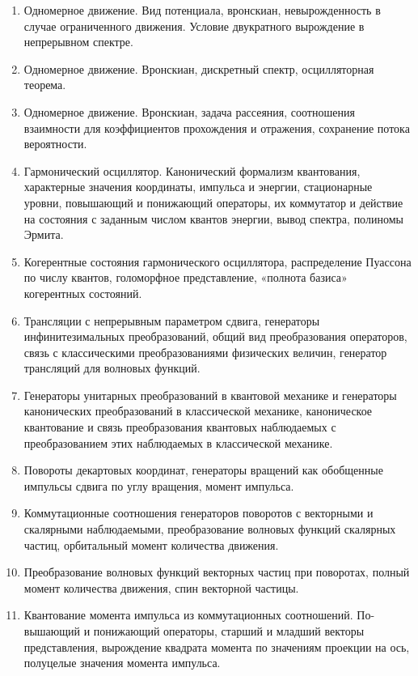 \begin{enumerate}
\item Одномерное движение. Вид потенциала, вронскиан, невырожденность
в случае ограниченного движения. Условие двукратного вырождение в
непрерывном спектре.

\item Одномерное движение. Вронскиан, дискретный спектр, осцилляторная
теорема.

\item Одномерное движение. Вронскиан, задача рассеяния, соотношения взаимности для коэффициентов прохождения и отражения, сохранение потока вероятности.

\item Гармонический осциллятор. Канонический формализм квантования, характерные значения координаты, импульса и энергии, стационарные
уровни, повышающий и понижающий операторы, их коммутатор и действие на состояния с заданным числом квантов энергии, вывод спектра,
полиномы Эрмита.

\item Когерентные состояния гармонического осциллятора, распределение
Пуассона по числу квантов, голоморфное представление, «полнота базиса» когерентных состояний.

\item Трансляции с непрерывным параметром сдвига, генераторы инфинитезимальных преобразований, общий вид преобразования операторов,
связь с классическими преобразованиями физических величин, генератор трансляций для волновых функций.

\item Генераторы унитарных преобразований в квантовой механике и генераторы канонических преобразований в классической механике, каноническое квантование и связь преобразования квантовых наблюдаемых с
преобразованием этих наблюдаемых в классической механике.

\item Повороты декартовых координат, генераторы вращений как обобщенные
импульсы сдвига по углу вращения, момент импульса.

\item Коммутационные соотношения генераторов поворотов с векторными и
скалярными наблюдаемыми, преобразование волновых функций скалярных частиц, орбитальный момент количества движения.

\item Преобразование волновых функций векторных частиц при поворотах,
полный момент количества движения, спин векторной частицы.

\item Квантование момента импульса из коммутационных соотношений. По-
вышающий и понижающий операторы, старший и младший векторы
представления, вырождение квадрата момента по значениям проекции
на ось, полуцелые значения момента импульса.


\end{enumerate}
